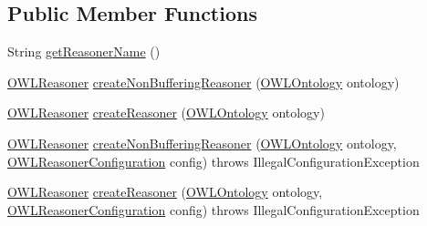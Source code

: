 \subsection*{Public Member Functions}
\begin{DoxyCompactItemize}
\item 
String \hyperlink{classorg_1_1semanticweb_1_1owlapi_1_1reasoner_1_1structural_1_1_structural_reasoner_factory_aee6fd6d27fd4f29246797c8e279b59f8}{get\-Reasoner\-Name} ()
\item 
\hyperlink{interfaceorg_1_1semanticweb_1_1owlapi_1_1reasoner_1_1_o_w_l_reasoner}{O\-W\-L\-Reasoner} \hyperlink{classorg_1_1semanticweb_1_1owlapi_1_1reasoner_1_1structural_1_1_structural_reasoner_factory_a747a448d807d10abdda95af1fba78df5}{create\-Non\-Buffering\-Reasoner} (\hyperlink{interfaceorg_1_1semanticweb_1_1owlapi_1_1model_1_1_o_w_l_ontology}{O\-W\-L\-Ontology} ontology)
\item 
\hyperlink{interfaceorg_1_1semanticweb_1_1owlapi_1_1reasoner_1_1_o_w_l_reasoner}{O\-W\-L\-Reasoner} \hyperlink{classorg_1_1semanticweb_1_1owlapi_1_1reasoner_1_1structural_1_1_structural_reasoner_factory_a88c377aabdd13914fd8d6c341aa6f513}{create\-Reasoner} (\hyperlink{interfaceorg_1_1semanticweb_1_1owlapi_1_1model_1_1_o_w_l_ontology}{O\-W\-L\-Ontology} ontology)
\item 
\hyperlink{interfaceorg_1_1semanticweb_1_1owlapi_1_1reasoner_1_1_o_w_l_reasoner}{O\-W\-L\-Reasoner} \hyperlink{classorg_1_1semanticweb_1_1owlapi_1_1reasoner_1_1structural_1_1_structural_reasoner_factory_a188a967446c57945fc24aea18008480e}{create\-Non\-Buffering\-Reasoner} (\hyperlink{interfaceorg_1_1semanticweb_1_1owlapi_1_1model_1_1_o_w_l_ontology}{O\-W\-L\-Ontology} ontology, \hyperlink{interfaceorg_1_1semanticweb_1_1owlapi_1_1reasoner_1_1_o_w_l_reasoner_configuration}{O\-W\-L\-Reasoner\-Configuration} config)  throws Illegal\-Configuration\-Exception 
\item 
\hyperlink{interfaceorg_1_1semanticweb_1_1owlapi_1_1reasoner_1_1_o_w_l_reasoner}{O\-W\-L\-Reasoner} \hyperlink{classorg_1_1semanticweb_1_1owlapi_1_1reasoner_1_1structural_1_1_structural_reasoner_factory_a2c1f13e068987545a04bd9aa43c62e1f}{create\-Reasoner} (\hyperlink{interfaceorg_1_1semanticweb_1_1owlapi_1_1model_1_1_o_w_l_ontology}{O\-W\-L\-Ontology} ontology, \hyperlink{interfaceorg_1_1semanticweb_1_1owlapi_1_1reasoner_1_1_o_w_l_reasoner_configuration}{O\-W\-L\-Reasoner\-Configuration} config)  throws Illegal\-Configuration\-Exception 
\end{DoxyCompactItemize}


